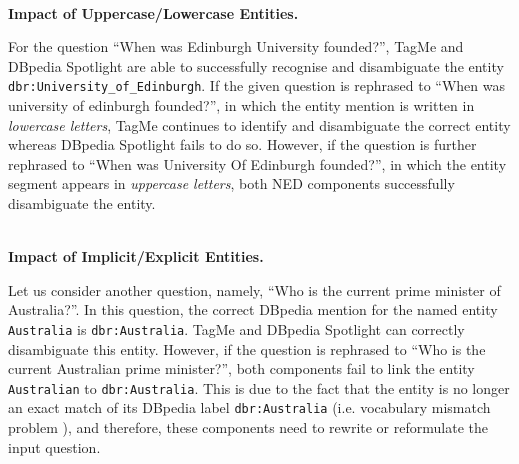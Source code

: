 \documentclass[sigconf,edbt]{acmart-edbt2019}
\newcommand{\qq}[1]{``#1''}
\newcommand{\jlt}[1]{\todo[inline, color=cyan]{JL: #1}}
\begin{document}
\begin{table}[hb!]
	\centering
		\caption{Top-2 NED Components on DBpedia. The performance of TagMe and DBpedia Spotlight is reported based on the LC-QuAD dataset. They are the best performing components across 3,253 questions; however, the performance of these NED components varies depending on the question features (cf.\ \autoref{fig:motivating}).}
    \label{tab:motivating}
\end{table} 
~\\
{\bf Impact of Uppercase/Lowercase Entities.} \begin{inparaenum}
For the question \qq{When was Edinburgh University founded?}, TagMe and DBpedia Spotlight are able to successfully recognise and disambiguate the entity \texttt{dbr:University\_of\_Edinburgh}. If the given question is rephrased to \qq{When was university of edinburgh founded?}, in which the entity mention is written in \textit{lowercase letters}, TagMe continues to identify and disambiguate the correct entity whereas DBpedia Spotlight fails to do so. However, if the question is further rephrased to \qq{When was University Of Edinburgh founded?}, in which the entity segment appears in \textit{uppercase letters}, both NED components successfully disambiguate the entity.
\end{inparaenum}
~\\
{\bf Impact of Implicit/Explicit Entities.} \begin{inparaenum}
Let us consider another question, namely, \qq{Who is the current prime minister of Australia?}. In this question, the correct DBpedia mention for the named entity \texttt{Australia} is \texttt{dbr:Australia}. TagMe and DBpedia Spotlight can correctly disambiguate this entity. However, if the question is rephrased to \qq{Who is the current Australian prime minister?}, both components fail to link the entity \texttt{Australian} to \texttt{dbr:Australia}.
This is due to the fact that the entity is no longer an exact match of its DBpedia label \texttt{dbr:Australia} (i.e. vocabulary mismatch problem \cite{DBLP:conf/aaai/ShekarpourMAS17}), and therefore, these components need to rewrite or reformulate the input question. 
\end{inparaenum}
\end{document}
